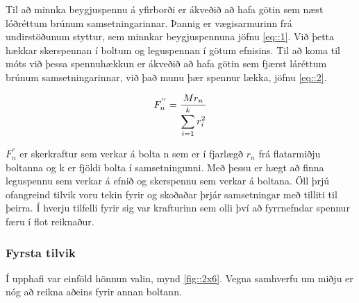 Til að minnka beygjuspennu á yfirborði er ákveðið að hafa götin sem næst lóðréttum brúnum samsetningarinnar.
Þannig er vægisarmurinn frá undirstöðunum styttur, sem minnkar beygjuspennuna \sbr jöfnu \ref{eq::1}. 
Við þetta hækkar skerspennan í boltum og leguspennan í götum efnisins. 
Til að koma til móts við þessa spennuhækkun er ákveðið að hafa götin sem fjærst láréttum brúnum samsetningarinnar, við það munu þær spennur lækka, \sbr jöfnu \ref{eq::2}\cite{shigleys}.

\begin{equation}
  F_n^{''} = {
    M r_n 
    \over 
    \displaystyle\sum_{i=1}^{k} r_i^2
  }
  \label{eq::2}
\end{equation}

$F_n^{''}$ er skerkraftur sem verkar á bolta n sem er í fjarlægð $r_n$ frá flatarmiðju boltanna og k er fjöldi bolta í samsetningunni. 
Með þessu er hægt að finna leguspennu sem verkar á efnið og skerspennu sem verkar á boltana. 
Öll þrjú ofangreind tilvik voru tekin fyrir og skoðaðar þrjár samsetningar með tilliti til þeirra.
Í hverju tilfelli fyrir sig var krafturinn sem olli því að fyrrnefndar spennur færu í flot reiknaður.

\subsubsection{Fyrsta tilvik}

Í upphafi var einföld hönnun valin, \sbr mynd \ref{fig::2x6}. Vegna samhverfu um miðju er nóg að reikna aðeins fyrir annan boltann.

